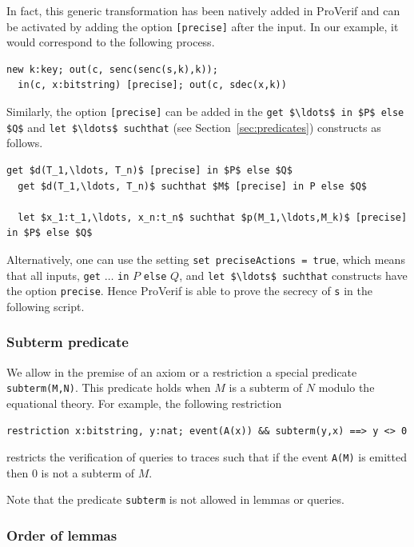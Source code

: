 \documentclass{book}
\begin{document}
In fact, this generic transformation has been natively added in ProVerif and can be activated by adding the option \lstinline![precise]! after the input. In our example, it would correspond to the following process.
\begin{lstlisting}[numbers=none]
  new k:key; out(c, senc(senc(s,k),k));
  in(c, x:bitstring) [precise]; out(c, sdec(x,k))
\end{lstlisting}

Similarly, the option \lstinline![precise]! can be added in
the \lstinline!get $\ldots$ in $P$ else $Q$! and
\lstinline!let $\ldots$ suchthat! (see Section~\ref{sec:predicates})
constructs as follows.

\begin{lstlisting}[numbers=none]
  get $d(T_1,\ldots, T_n)$ [precise] in $P$ else $Q$
  get $d(T_1,\ldots, T_n)$ suchthat $M$ [precise] in P else $Q$

  let $x_1:t_1,\ldots, x_n:t_n$ suchthat $p(M_1,\ldots,M_k)$ [precise] in $P$ else $Q$
\end{lstlisting}
Alternatively, one can use the setting \lstinline!set preciseActions = true!, which means that all inputs, \lstinline!get! $\ldots$ \lstinline!in! $P$ \lstinline!else! $Q$, and \lstinline!let $\ldots$ suchthat! constructs have the option \lstinline!precise!. Hence ProVerif is able to prove the secrecy of \lstinline!s! in the following script.



\subsubsection{Subterm predicate}

We allow in the premise of an axiom or a restriction a special predicate \lstinline!subterm(M,N)!. This predicate holds when $M$ is a subterm of $N$ modulo the equational theory. For example, the following restriction

\begin{lstlisting}[numbers=none]
  restriction x:bitstring, y:nat; event(A(x)) && subterm(y,x) ==> y <> 0
\end{lstlisting}
restricts the verification of queries to traces such that if the event \lstinline!A(M)! is emitted then $0$ is not a subterm of $M$.

Note that the predicate \lstinline!subterm! is not allowed in lemmas or queries.

\subsubsection{Order of lemmas}
\end{document}
